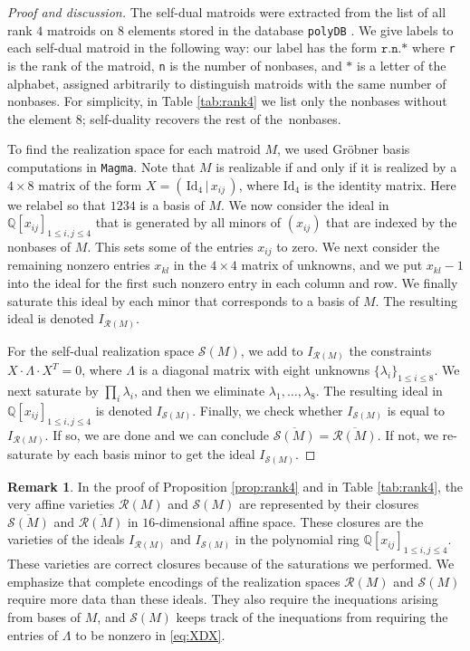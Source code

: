 \documentclass[12pt]{extarticle}
\theoremstyle{definition}
\newtheorem{remark}[theorem]{Remark}
\numberwithin{theorem}{section}
\theoremstyle{plain}\newtheorem{ithm}{Theorem}
\newcommand{\QQ}{\mathbb{Q}}
\begin{document}
\begin{proof}[Proof and discussion]
The self-dual matroids were extracted from the list of all rank $4$ matroids on $8$ elements stored in the database \texttt{polyDB} \cite{Paf}.
We give labels to each self-dual matroid in the following way: our label has the form $
\texttt{r.n.*}$ where {\tt r} is the rank of the matroid, {\tt n} is the number of nonbases, and $*$ is a letter of the alphabet, assigned arbitrarily to distinguish matroids with the same number of nonbases. For simplicity, 
 in Table \ref{tab:rank4}
 we list only the nonbases without the element $8$; self-duality recovers the rest of the~nonbases.


To find the realization space for each matroid $M$, we used Gr\"obner basis computations
in {\tt Magma}.
Note that $M$ is realizable if and only if it is realized by a $4 \times 8$ matrix 
of the form $ X = (\,\text{Id}_4 \,|\,  x_{ij} \,) $,
where $\text{Id}_4$ is the identity matrix.
Here we relabel so that $1234$ is a basis of $M$.
We now consider the ideal in $\QQ[x_{ij}]_{1 \leq i , j \leq 4}$ 
that is generated by all minors of $(x_{ij})$
that are indexed by the nonbases of $M$. This sets some of
the entries $x_{ij}$ to zero. We next consider the remaining nonzero entries $x_{kl}$
in the $4 \times 4$ matrix of unknowns, and we put $x_{kl}-1$ into the ideal
for the first such nonzero entry in each column and row.
We finally saturate this ideal by each minor that corresponds to a 
basis of $M$. The resulting ideal is denoted $I_{\mathcal{R}(M)}$.

For the self-dual realization space $\mathcal{S}(M)$, we add to  $I_{\mathcal{R}(M)}$ the constraints $X \cdot \Lambda \cdot X^T = 0$, where $\Lambda $ is a diagonal matrix with eight unknowns $\{\lambda_i\}_{1 \leq i \leq 8}$. We next saturate by $
\prod_i \lambda_i$, and then we eliminate 
$\lambda_1,\ldots,\lambda_8$.
The resulting ideal in  $\QQ[x_{ij}]_{1 \leq i , j \leq 4}$ 
is denoted $I_{\mathcal{S}(M)}$.
 Finally, we check whether $I_{\mathcal{S}(M)}$ is equal to  $I_{\mathcal{R}(M)}$.    If so, we are done and we can conclude  $\overline{\mathcal{S}(M)} = \overline{\mathcal{R}(M)}$. If not, we re-saturate by each basis minor to get the ideal  $I_{\mathcal{S}(M)}$.
 \end{proof}
 
 \begin{remark} \label{rmk:representveryaffine}
In the proof of Proposition \ref{prop:rank4} and in  Table \ref{tab:rank4},
  the very affine varieties 
$\mathcal{R}(M)$ and $ \mathcal{S}(M)$ are represented 
by their closures  $\overline{\mathcal{S}(M)}$ and $ \overline{\mathcal{R}(M)}$
in  $16$-dimensional affine space. These closures are the varieties of the ideals
 $I_{\mathcal{R}(M)}$ and  $I_{\mathcal{S}(M)}$ in the polynomial ring
$\QQ[x_{ij}]_{1 \leq i , j \leq 4}$. These varieties are 
correct closures because of the saturations we performed.
We emphasize that complete encodings of the realization spaces
$\mathcal{R}(M)$ and $\mathcal{S}(M)$ require more data
than these ideals. They also require the inequations arising from bases of $M$, and $\mathcal{S}(M)$ keeps track of the inequations from requiring the entries of $\Lambda$ to be nonzero in \eqref{eq:XDX}.
\end{remark}
\end{document}
